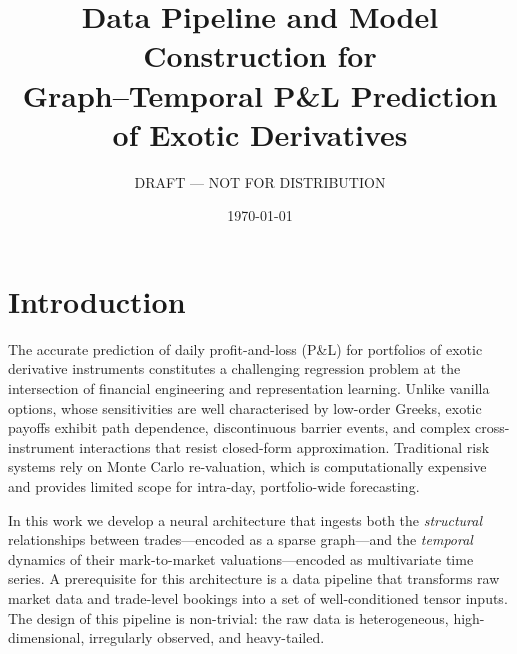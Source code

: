 \documentclass[11pt,a4paper]{article}
\title{%
  Data Pipeline and Model Construction for \\
  Graph--Temporal P\&L Prediction of Exotic Derivatives%
}
\author{DRAFT --- NOT FOR DISTRIBUTION}
\date{\today}
\begin{document}
\maketitle

\section{Introduction}\label{sec:intro}

The accurate prediction of daily profit-and-loss (P\&L) for portfolios of
exotic derivative instruments constitutes a challenging regression problem at
the intersection of financial engineering and representation learning.  Unlike
vanilla options, whose sensitivities are well characterised by low-order Greeks,
exotic payoffs exhibit path dependence, discontinuous barrier events, and
complex cross-instrument interactions that resist closed-form approximation.
Traditional risk systems rely on Monte Carlo re-valuation, which is
computationally expensive and provides limited scope for intra-day,
portfolio-wide forecasting.

In this work we develop a neural architecture that ingests both the
\emph{structural} relationships between trades---encoded as a sparse
graph---and the \emph{temporal} dynamics of their mark-to-market
valuations---encoded as multivariate time series.  A prerequisite for this
architecture is a data pipeline that transforms raw market data and trade-level
bookings into a set of well-conditioned tensor inputs.  The design of this
pipeline is non-trivial: the raw data is heterogeneous, high-dimensional,
irregularly observed, and heavy-tailed.
\end{document}

